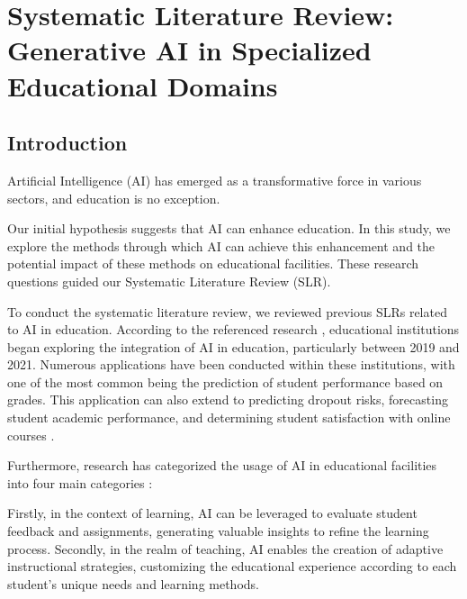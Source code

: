 \chapter{Systematic Literature Review: Generative AI in Specialized Educational Domains}
\label{chap:Systematic_Literature_Review:_Generative_AI_in_Specialized_Educational_Domains}


\section{Introduction}
\label{introduction}
Artificial Intelligence (AI) has emerged as a transformative force in various sectors, and education is no exception.

Our initial hypothesis suggests that AI can enhance education. In this study, we explore the methods through which AI can achieve this enhancement and the potential impact of these methods on educational facilities. These research questions guided our Systematic Literature Review (SLR).

To conduct the systematic literature review, we reviewed previous SLRs related to AI in education. According to the referenced research \cite{Artificial_intelligence_in_online_higher_education:_A_systematic_review_of_empirical}, educational institutions began exploring the integration of AI in education, particularly between 2019 and 2021. Numerous applications have been conducted within these institutions, with one of the most common being the prediction of student performance based on grades. This application can also extend to predicting dropout risks, forecasting student academic performance, and determining student satisfaction with online courses \cite{Artificial_intelligence_in_online_higher_education:_A_systematic_review_of_empirical} \cite{AI_IN_Education_SLR}.

Furthermore, research has categorized the usage of AI in educational facilities into four main categories \cite{Systematic_literature_review_on_opportunities_challenges_and_future_research_recommendations_of_artificial_intelligence_in_education}:

Firstly, in the context of learning, AI can be leveraged to evaluate student feedback and assignments, generating valuable insights to refine the learning process. Secondly, in the realm of teaching, AI enables the creation of adaptive instructional strategies, customizing the educational experience according to each student's unique needs and learning methods.

